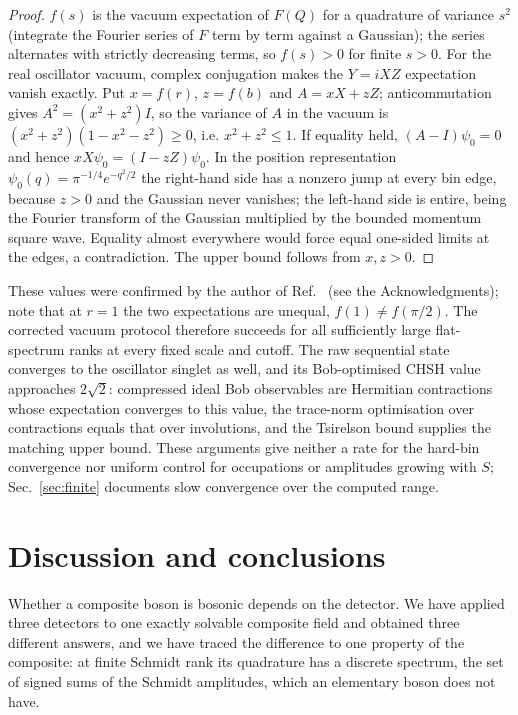 \documentclass[11pt,a4paper]{article}
\begin{document}
\begin{proof}
$f(s)$ is the vacuum expectation of $F(Q)$ for a quadrature of variance $s^2$ (integrate the Fourier series of $F$ term by term against a Gaussian); the series alternates with strictly decreasing terms, so $f(s)>0$ for finite $s>0$. For the real oscillator vacuum, complex conjugation makes the $Y=iXZ$ expectation vanish exactly. Put $x=f(r)$, $z=f(b)$ and $A=xX+zZ$; anticommutation gives $A^2=(x^2+z^2)I$, so the variance of $A$ in the vacuum is $(x^2+z^2)(1-x^2-z^2)\ge0$, i.e. $x^2+z^2\le1$. If equality held, $(A-I)\psi_0=0$ and hence $xX\psi_0=(I-zZ)\psi_0$. In the position representation $\psi_0(q)=\pi^{-1/4}e^{-q^2/2}$ the right-hand side has a nonzero jump at every bin edge, because $z>0$ and the Gaussian never vanishes; the left-hand side is entire, being the Fourier transform of the Gaussian multiplied by the bounded momentum square wave. Equality almost everywhere would force equal one-sided limits at the edges, a contradiction. The upper bound follows from $x,z>0$.
\end{proof}

These values were confirmed by the author of Ref.~\cite{Sorella2026} (see the Acknowledgments); note that at $r=1$ the two expectations are unequal, $f(1)\ne f(\pi/2)$. The corrected vacuum protocol therefore succeeds for all sufficiently large flat-spectrum ranks at every fixed scale and cutoff. The raw sequential state converges to the oscillator singlet as well, and its Bob-optimised CHSH value approaches $2\sqrt2$: compressed ideal Bob observables are Hermitian contractions whose expectation converges to this value, the trace-norm optimisation over contractions equals that over involutions, and the Tsirelson bound \cite{Cirelson1980} supplies the matching upper bound. These arguments give neither a rate for the hard-bin convergence nor uniform control for occupations or amplitudes growing with $S$; Sec.~\ref{sec:finite} documents slow convergence over the computed range.

\section{Discussion and conclusions}
\label{sec:conclusion}
Whether a composite boson is bosonic depends on the detector. We have applied three detectors to one exactly solvable composite field and obtained three different answers, and we have traced the difference to one property of the composite: at finite Schmidt rank its quadrature has a discrete spectrum, the set of signed sums of the Schmidt amplitudes, which an elementary boson does not have.
\end{document}
